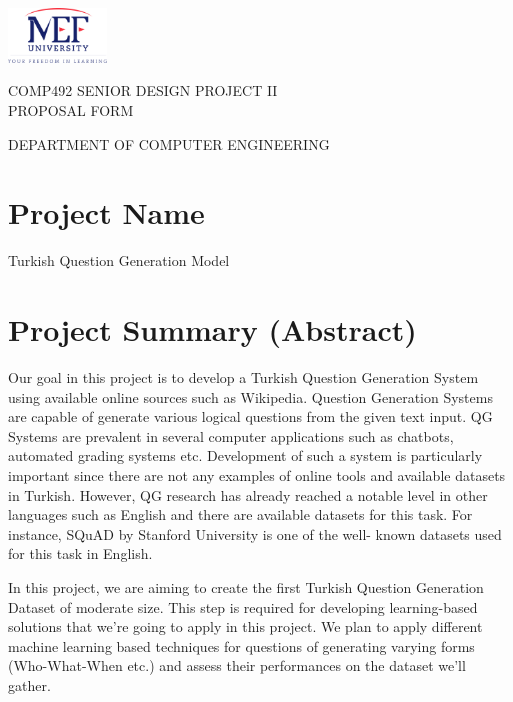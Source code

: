 \documentclass[10pt]{article}
\begin{document}
	
	\begin{flushright}
		\vspace*{-7em}
		\includegraphics[height=1.45cm]{./assets/mef_logo.png}
	\end{flushright}

	
	\begin{spacing}{1.1}
	{\color{azure}
		\bfseries
		\huge{
			\noindent
			COMP492 SENIOR DESIGN PROJECT II \\
			PROPOSAL FORM \par}
		\large{
			\noindent
			DEPARTMENT OF COMPUTER ENGINEERING \newline \par
		}
	}
	\end{spacing}
	\vspace{-2em}
	\section{Project Name}
	
	Turkish Question Generation Model
	

	\section{Project Summary (Abstract)}
	
	Our goal in this project is to develop a Turkish Question Generation System using available online sources such as Wikipedia. Question Generation Systems are capable of generate various logical questions from the given text input. QG Systems are prevalent in several computer applications such as chatbots, automated grading systems etc. Development of such a system is particularly important since there are not any examples of online tools and available datasets in Turkish. However, QG research has already reached a notable level in other languages such as English and there are available datasets for this task. For instance, SQuAD by Stanford University is one of the well- known datasets used for this task in English. \newline \par
	
	In this project, we are aiming to create the first Turkish Question Generation Dataset of moderate size. This step is required for developing learning-based solutions that we’re going to apply in this project. We plan to apply different machine learning based techniques for questions of generating varying forms (Who-What-When etc.) and assess their performances on the dataset we’ll gather. \newline \par
	
\end{document}
